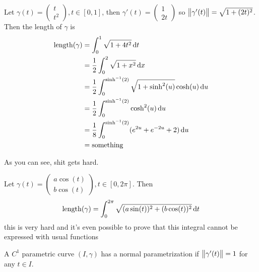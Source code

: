 \documentclass[12pt]{extarticle}
\begin{document}
\begin{example}[length of $y = x^2$ between $(0,0)$ and $(1,1)$]
    Let $\gamma(t) = \begin{pmatrix}
            t \\ t^2
        \end{pmatrix}, t \in [0, 1]$,
    then $\gamma'(t) = \begin{pmatrix}
            1 \\ 2t
        \end{pmatrix}$
    so $\norm{\gamma'(t)} = \sqrt{1+(2t)^2}$.
    Then the length of $\gamma$ is
    \begin{align}
        {\operatorfont length}(\gamma) & = \int_0^1 \sqrt{1 + 4t^2} \dd{t}                                        \\
                                       & = \frac{1}{2} \int_0^2 \sqrt{1+x^2} \dd{x}                               \\
                                       & = \frac{1}{2} \int_0^{\sinh^{-1}(2)} \sqrt{1+\sinh^2(u)} \cosh(u) \dd{u} \\
                                       & = \frac{1}{2} \int_0^{\sinh^{-1}(2)} \cosh^2(u) \dd{u}                   \\
                                       & = \frac{1}{8} \int_0^{\sinh^{-1}(2)} (e^{2u} + e^{-2u} + 2) \dd{u}       \\
                                       & = \text{something}
    \end{align}

    As you can see, shit gets hard.
\end{example}

\begin{example}
    Let $\gamma(t) = \begin{pmatrix}
            a \cos (t) \\
            b \cos (t)
        \end{pmatrix}, t \in[0, 2\pi]$.
    Then
    \begin{equation}
        {\operatorfont length}(\gamma) = \int_0^{2\pi} \sqrt{(a \sin(t))^2 + (b \cos (t))^2} \dd{t}
    \end{equation}
    this is very hard and it's even possible to prove that this integral cannot be expressed with usual functions
\end{example}

\begin{definition}
    A $C^1$ parametric curve $(I, \gamma)$ has a normal parametrization if $\norm{\gamma'(t)} = 1$ for any $t \in I$.
\end{definition}
\end{document}
